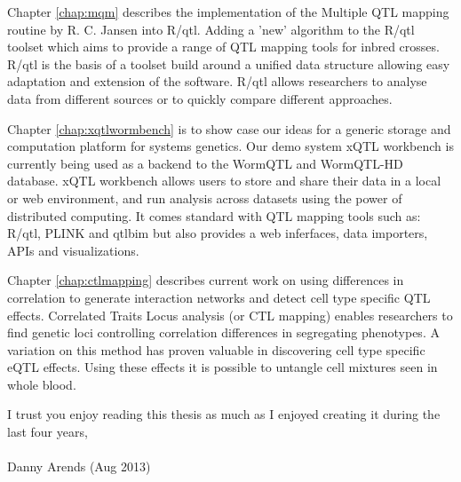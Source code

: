 \documentclass[8pt, twoside]{book}
\begin{document}
Chapter \ref{chap:mqm} describes the implementation of the Multiple QTL mapping routine 
by R. C. Jansen into R/qtl. Adding a 'new' algorithm to the R/qtl toolset which aims to 
provide a range of QTL mapping tools for inbred crosses. R/qtl is the basis of a toolset 
build around a unified data structure allowing easy adaptation and extension of the software. 
R/qtl allows researchers to analyse data from different sources or to quickly compare 
different approaches.

Chapter \ref{chap:xqtlwormbench} is to show case our ideas for a generic storage and 
computation platform for systems genetics. Our demo system xQTL workbench is currently 
being used as a backend to the WormQTL and WormQTL-HD database. xQTL workbench allows 
users to store and share their data in a local or web environment, and run analysis across 
datasets using the power of distributed computing. It comes standard with QTL mapping 
tools such as: R/qtl, PLINK and qtlbim but also provides a web inferfaces, data importers, 
APIs and visualizations.

Chapter \ref{chap:ctlmapping} describes current work on using differences in correlation to 
generate interaction networks and detect cell type specific QTL effects. Correlated Traits 
Locus analysis (or CTL mapping) enables researchers to find genetic loci controlling correlation 
differences in segregating phenotypes. A variation on this method has proven valuable in 
discovering cell type specific eQTL effects. Using these effects it is possible 
to untangle cell mixtures seen in whole blood.

I trust you enjoy reading this thesis as much as I enjoyed creating it during the last four years,\\\\

Danny Arends (Aug 2013)
\newpage
\thispagestyle{empty}


















{\footnotesize

}
\end{document}
